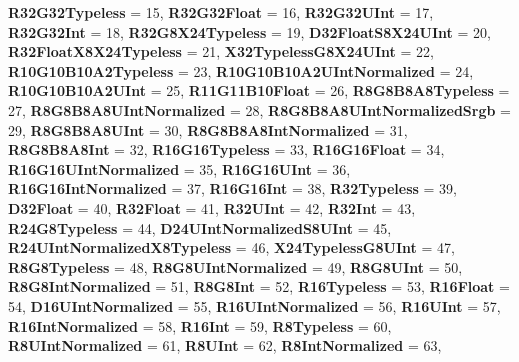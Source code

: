 \begin{DoxyCompactItemize}
{\bfseries R32\+G32\+Typeless} = 15, 
\newline
{\bfseries R32\+G32\+Float} = 16, 
{\bfseries R32\+G32\+U\+Int} = 17, 
{\bfseries R32\+G32\+Int} = 18, 
{\bfseries R32\+G8\+X24\+Typeless} = 19, 
\newline
{\bfseries D32\+Float\+S8\+X24\+U\+Int} = 20, 
{\bfseries R32\+Float\+X8\+X24\+Typeless} = 21, 
{\bfseries X32\+Typeless\+G8\+X24\+U\+Int} = 22, 
{\bfseries R10\+G10\+B10\+A2\+Typeless} = 23, 
\newline
{\bfseries R10\+G10\+B10\+A2\+U\+Int\+Normalized} = 24, 
{\bfseries R10\+G10\+B10\+A2\+U\+Int} = 25, 
{\bfseries R11\+G11\+B10\+Float} = 26, 
{\bfseries R8\+G8\+B8\+A8\+Typeless} = 27, 
\newline
{\bfseries R8\+G8\+B8\+A8\+U\+Int\+Normalized} = 28, 
{\bfseries R8\+G8\+B8\+A8\+U\+Int\+Normalized\+Srgb} = 29, 
{\bfseries R8\+G8\+B8\+A8\+U\+Int} = 30, 
{\bfseries R8\+G8\+B8\+A8\+Int\+Normalized} = 31, 
\newline
{\bfseries R8\+G8\+B8\+A8\+Int} = 32, 
{\bfseries R16\+G16\+Typeless} = 33, 
{\bfseries R16\+G16\+Float} = 34, 
{\bfseries R16\+G16\+U\+Int\+Normalized} = 35, 
\newline
{\bfseries R16\+G16\+U\+Int} = 36, 
{\bfseries R16\+G16\+Int\+Normalized} = 37, 
{\bfseries R16\+G16\+Int} = 38, 
{\bfseries R32\+Typeless} = 39, 
\newline
{\bfseries D32\+Float} = 40, 
{\bfseries R32\+Float} = 41, 
{\bfseries R32\+U\+Int} = 42, 
{\bfseries R32\+Int} = 43, 
\newline
{\bfseries R24\+G8\+Typeless} = 44, 
{\bfseries D24\+U\+Int\+Normalized\+S8\+U\+Int} = 45, 
{\bfseries R24\+U\+Int\+Normalized\+X8\+Typeless} = 46, 
{\bfseries X24\+Typeless\+G8\+U\+Int} = 47, 
\newline
{\bfseries R8\+G8\+Typeless} = 48, 
{\bfseries R8\+G8\+U\+Int\+Normalized} = 49, 
{\bfseries R8\+G8\+U\+Int} = 50, 
{\bfseries R8\+G8\+Int\+Normalized} = 51, 
\newline
{\bfseries R8\+G8\+Int} = 52, 
{\bfseries R16\+Typeless} = 53, 
{\bfseries R16\+Float} = 54, 
{\bfseries D16\+U\+Int\+Normalized} = 55, 
\newline
{\bfseries R16\+U\+Int\+Normalized} = 56, 
{\bfseries R16\+U\+Int} = 57, 
{\bfseries R16\+Int\+Normalized} = 58, 
{\bfseries R16\+Int} = 59, 
\newline
{\bfseries R8\+Typeless} = 60, 
{\bfseries R8\+U\+Int\+Normalized} = 61, 
{\bfseries R8\+U\+Int} = 62, 
{\bfseries R8\+Int\+Normalized} = 63, 
\newline

\end{DoxyCompactItemize}
